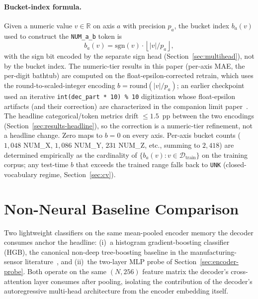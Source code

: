 \documentclass[11pt,a4paper]{article}
\begin{document}
\paragraph{Bucket-index formula.} Given a numeric value $v\in\mathbb{R}$ on axis $a$ with precision $p_a$, the bucket index $b_a(v)$ used to construct the \texttt{NUM\_a\_b} token is
\begin{equation*}
b_a(v) = \mathrm{sgn}(v)\cdot\left\lfloor |v|/p_a \right\rfloor,
\end{equation*}
with the sign bit encoded by the separate sign head (Section~\ref{sec:multihead}), not by the bucket index. The numeric-tier results in this paper (per-axis MAE, the per-digit bathtub) are computed on the float-epsilon-corrected retrain, which uses the round-to-scaled-integer encoding $b = \mathrm{round}(|v|/p_a)$; an earlier checkpoint used an iterative \texttt{int(dec\_part * 10) \% 10} digitization whose float-epsilon artifacts (and their correction) are characterized in the companion limit paper~\cite{paperB_entropy}. The headline categorical/token metrics drift $\le\!1.5$~pp between the two encodings (Section~\ref{sec:results-headline}), so the correction is a numeric-tier refinement, not a headline change. Zero maps to $b\!=\!0$ on every axis. Per-axis bucket counts ($1{,}048$ NUM\_X, $1{,}086$ NUM\_Y, $231$ NUM\_Z, etc., summing to $2{,}418$) are determined empirically as the cardinality of $\{b_a(v):v\in\mathcal{D}_{\text{train}}\}$ on the training corpus; any test-time $b$ that exceeds the trained range falls back to \texttt{UNK} (closed-vocabulary regime, Section~\ref{sec:cv}).

\section{Non-Neural Baseline Comparison}
\label{supp:app-baselines}
Two lightweight classifiers on the same mean-pooled encoder memory the decoder consumes anchor the headline: (i)~a histogram gradient-boosting classifier (HGB), the canonical non-deep tree-boosting baseline in the manufacturing-sensor literature~\cite{chen2016xgboost,janssens2016convolutional,stathatos2024cnn}, and (ii)~the two-layer MLP probe of Section~\ref{sec:encoder-probe}. Both operate on the same $(N,256)$ feature matrix the decoder's cross-attention layer consumes after pooling, isolating the contribution of the decoder's autoregressive multi-head architecture from the encoder embedding itself.
\end{document}
